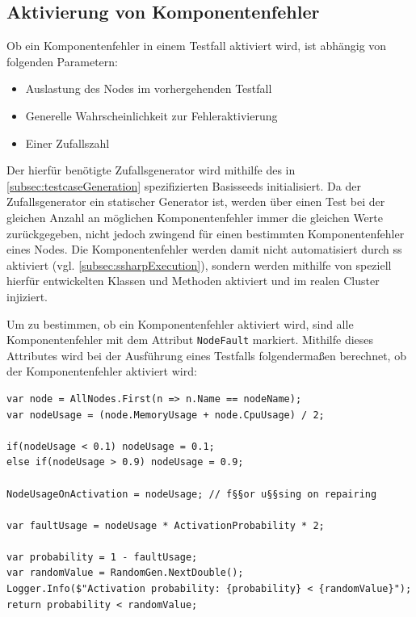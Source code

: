 \subsection{Aktivierung von Komponentenfehler}
\label{subsec:faultActivation}

Ob ein Komponentenfehler in einem \gls{Testfall} aktiviert wird, ist abhängig von folgenden Parametern:

\begin{itemize}
    \item Auslastung des Nodes im vorhergehenden Testfall
    \item Generelle Wahrscheinlichkeit zur Fehleraktivierung
    \item Einer Zufallszahl
\end{itemize}

Der hierfür benötigte Zufallsgenerator wird mithilfe des in \cref{subsec:testcaseGeneration} spezifizierten Basisseeds initialisiert.
Da der Zufallsgenerator ein statischer Generator ist, werden über einen \gls{Test} bei der gleichen Anzahl an möglichen Komponentenfehler immer die gleichen Werte zurückgegeben, nicht jedoch zwingend für einen bestimmten Komponentenfehler eines Nodes.
Die Komponentenfehler werden damit nicht automatisiert durch \gls{ss} aktiviert (vgl. \cref{subsec:ssharpExecution}), sondern werden mithilfe von speziell hierfür entwickelten Klassen und Methoden aktiviert und im realen Cluster injiziert.

Um zu bestimmen, ob ein Komponentenfehler aktiviert wird, sind alle Komponentenfehler mit dem Attribut \texttt{NodeFault} markiert.
Mithilfe dieses Attributes wird bei der Ausführung eines Testfalls folgendermaßen berechnet, ob der Komponentenfehler aktiviert wird:

\begin{lstlisting}[label=lst:faultActivationCalc,style=cs,
caption={[Berechnung der Aktivierung von Komponentenfehlern]
    Berechnung der Aktivierung von Komponentenfehlern (zusammengefasst).}]
var node = AllNodes.First(n => n.Name == nodeName);
var nodeUsage = (node.MemoryUsage + node.CpuUsage) / 2;

if(nodeUsage < 0.1) nodeUsage = 0.1;
else if(nodeUsage > 0.9) nodeUsage = 0.9;

NodeUsageOnActivation = nodeUsage; // f§§or u§§sing on repairing

var faultUsage = nodeUsage * ActivationProbability * 2;

var probability = 1 - faultUsage;
var randomValue = RandomGen.NextDouble();
Logger.Info($"Activation probability: {probability} < {randomValue}");
return probability < randomValue;
\end{lstlisting}

